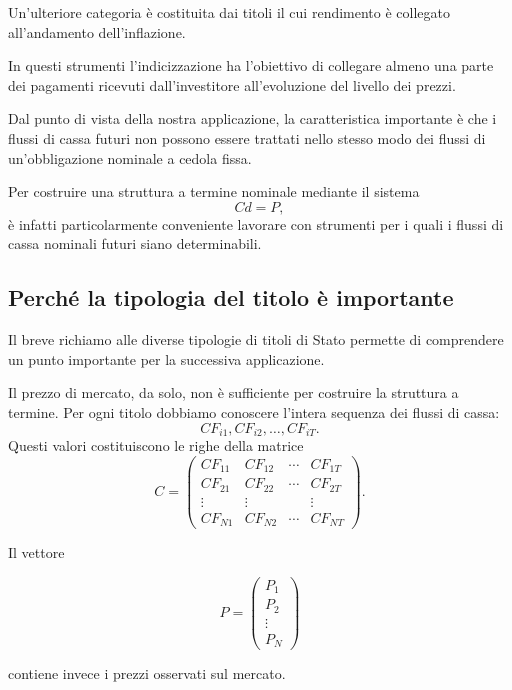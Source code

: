 Un'ulteriore categoria è costituita dai titoli il cui rendimento è
collegato all'andamento dell'inflazione.

In questi strumenti l'indicizzazione ha l'obiettivo di collegare
almeno una parte dei pagamenti ricevuti dall'investitore
all'evoluzione del livello dei prezzi.

Dal punto di vista della nostra applicazione, la caratteristica
importante è che i flussi di cassa futuri non possono essere
trattati nello stesso modo dei flussi di un'obbligazione nominale
a cedola fissa.

Per costruire una struttura a termine nominale mediante il sistema
$$
    Cd=P,
$$
è infatti particolarmente conveniente lavorare con strumenti per
i quali i flussi di cassa nominali futuri siano determinabili.

\subsection{Perché la tipologia del titolo è importante}

Il breve richiamo alle diverse tipologie di titoli di Stato permette
di comprendere un punto importante per la successiva applicazione.

Il prezzo di mercato, da solo, non è sufficiente per costruire la
struttura a termine. Per ogni titolo dobbiamo conoscere l'intera
sequenza dei flussi di cassa:
$$
    CF_{i1},CF_{i2},\ldots,CF_{iT}.
$$
Questi valori costituiscono le righe della matrice
\begin{equation*}
C=
\begin{pmatrix}
CF_{11} & CF_{12} & \cdots & CF_{1T}\\
CF_{21} & CF_{22} & \cdots & CF_{2T}\\
\vdots  & \vdots  &        & \vdots\\
CF_{N1} & CF_{N2} & \cdots & CF_{NT}
\end{pmatrix}.
\end{equation*}

Il vettore

\begin{equation*}
P=
\begin{pmatrix}
P_1\\
P_2\\
\vdots\\
P_N
\end{pmatrix}
\end{equation*}

contiene invece i prezzi osservati sul mercato.

